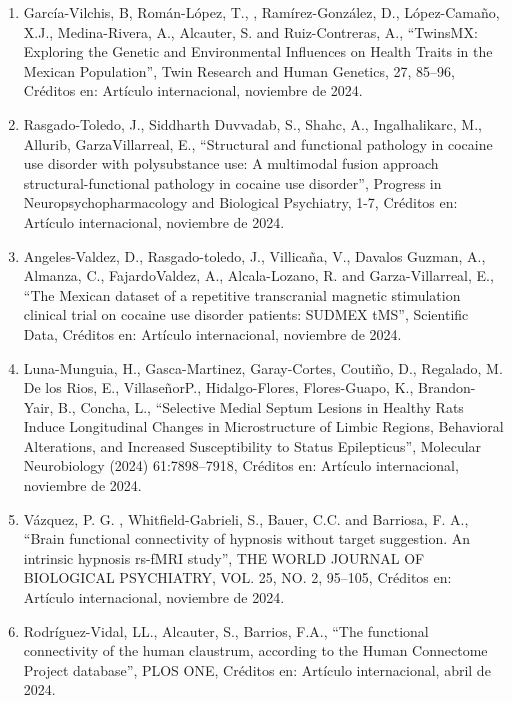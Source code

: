 \documentclass[12pt]{article}
\begin{document}
\begin{enumerate}
\item García-Vilchis, B, Román-López, T., , Ramírez-González, D., López-Camaño, X.J., Medina-Rivera, A., Alcauter, S. and 
Ruiz-Contreras, 
A., “TwinsMX: Exploring the Genetic and Environmental Influences on Health Traits in the Mexican Population”, Twin Research and Human 
Genetics, 27, 85–96, Créditos en: Artículo internacional, noviembre de 2024.

\item Rasgado-Toledo, J., Siddharth Duvvadab, S., Shahc, A., Ingalhalikarc, M., Allurib, GarzaVillarreal, E., “Structural and 
functional 
pathology in cocaine use disorder with polysubstance use: A multimodal fusion approach structural-functional pathology in cocaine use 
disorder”, Progress in Neuropsychopharmacology and Biological Psychiatry, 1-7, Créditos en: Artículo internacional, noviembre de 2024.

\item Angeles-Valdez, D., Rasgado-toledo, J., Villicaña, V., Davalos Guzman, A., Almanza, C., FajardoValdez, A., Alcala-Lozano, R. and
Garza-Villarreal, E., “The Mexican dataset of a repetitive transcranial magnetic stimulation clinical trial on cocaine use disorder 
patients: SUDMEX tMS”, Scientific Data, Créditos en: Artículo internacional, noviembre de 2024.

\item Luna-Munguia, H., Gasca-Martinez, Garay-Cortes, Coutiño, D., Regalado, M. De los Rios, E., VillaseñorP., Hidalgo-Flores, 
Flores-Guapo, K., Brandon-Yair, B., Concha, L., “Selective Medial Septum Lesions in Healthy Rats Induce Longitudinal Changes in 
Microstructure of Limbic Regions, Behavioral Alterations, and Increased Susceptibility to Status Epilepticus”, Molecular Neurobiology 
(2024) 61:7898–7918, Créditos en: Artículo internacional, noviembre de 2024.

\item Vázquez, P. G. , Whitfield-Gabrieli, S., Bauer, C.C. and Barriosa, F. A., “Brain functional connectivity of hypnosis without 
target 
suggestion. An intrinsic hypnosis rs-fMRI study”, THE WORLD JOURNAL OF BIOLOGICAL PSYCHIATRY, VOL. 25, NO. 2, 95–105, Créditos en: 
Artículo internacional, noviembre de 2024.

\item Rodríguez-Vidal, LL., Alcauter, S., Barrios, F.A., “The functional connectivity of the human claustrum, according to the Human 
Connectome Project database”, PLOS ONE, Créditos en: Artículo internacional, abril de 2024.


\end{enumerate}
\end{document}
